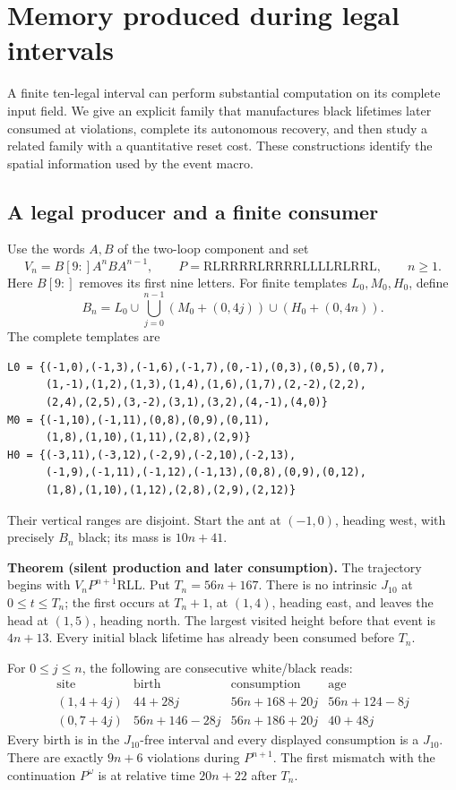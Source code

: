 \section{Memory produced during legal intervals}\label{app:legal-memory}
\label{sec:silent-memory}
A finite ten-legal interval can perform substantial computation on its
complete input field. We give an explicit family that manufactures black
lifetimes later consumed at violations, complete its autonomous recovery, and then study a related family with
a quantitative reset cost. These
constructions identify the spatial information used by the event macro.

\subsection{A legal producer and a finite consumer}
Use the words \(A,B\) of the two-loop component and set
\[
 V_n=B[9:]A^nBA^{n-1},\qquad
 P=\mathrm{RLRRRRLRRRRLLLLRLRRL},\qquad n\ge1.
\]
Here \(B[9:]\) removes its first nine letters. For finite templates
\(L_0,M_0,H_0\), define
\[
 B_n=L_0\cup\bigcup_{j=0}^{n-1}(M_0+(0,4j))
              \cup(H_0+(0,4n)).
\]
The complete templates are
\begin{verbatim}
L0 = {(-1,0),(-1,3),(-1,6),(-1,7),(0,-1),(0,3),(0,5),(0,7),
      (1,-1),(1,2),(1,3),(1,4),(1,6),(1,7),(2,-2),(2,2),
      (2,4),(2,5),(3,-2),(3,1),(3,2),(4,-1),(4,0)}
M0 = {(-1,10),(-1,11),(0,8),(0,9),(0,11),
      (1,8),(1,10),(1,11),(2,8),(2,9)}
H0 = {(-3,11),(-3,12),(-2,9),(-2,10),(-2,13),
      (-1,9),(-1,11),(-1,12),(-1,13),(0,8),(0,9),(0,12),
      (1,8),(1,10),(1,12),(2,8),(2,9),(2,12)}
\end{verbatim}
Their vertical ranges are disjoint. Start the ant at \((-1,0)\), heading
west, with precisely \(B_n\) black; its mass is \(10n+41\).

\textbf{Theorem (silent production and later consumption).}
The trajectory begins with \(V_nP^{n+1}\mathrm{RLL}\). Put
\(T_n=56n+167\). There is no intrinsic \(J_{10}\) at
\(0\le t\le T_n\); the first occurs at \(T_n+1\), at \((1,4)\), heading
east, and leaves the head at \((1,5)\), heading north. The largest visited
height before that event is \(4n+13\). Every initial black lifetime has
already been consumed before \(T_n\).

For \(0\le j\le n\), the following are consecutive white/black reads:
\[
\begin{array}{c|c|c|c}
\text{site}&\text{birth}&\text{consumption}&\text{age}\\\hline
(1,4+4j)&44+28j&56n+168+20j&56n+124-8j\\
(0,7+4j)&56n+146-28j&56n+186+20j&40+48j
\end{array}
\]
Every birth is in the \(J_{10}\)-free interval and every displayed
consumption is a \(J_{10}\). There are exactly \(9n+6\) violations during
\(P^{n+1}\). The first mismatch with the continuation \(P^\omega\) is at
relative time \(20n+22\) after \(T_n\).

